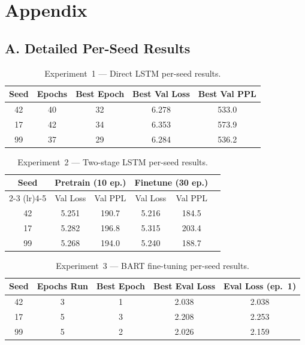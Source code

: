 \documentclass{article}
\begin{document}
\section*{Appendix}

\subsection*{A. Detailed Per-Seed Results}

\begin{table}[ht]
  \caption{Experiment~1 --- Direct LSTM per-seed results.}
  \centering
  \small
  \begin{tabular}{ccccc}
    \toprule
    Seed & Epochs & Best Epoch & Best Val Loss & Best Val PPL \\
    \midrule
    42 & 40 & 32 & 6.278 & 533.0 \\
    17 & 42 & 34 & 6.353 & 573.9 \\
    99 & 37 & 29 & 6.284 & 536.2 \\
    \bottomrule
  \end{tabular}
\end{table}

\begin{table}[ht]
  \caption{Experiment~2 --- Two-stage LSTM per-seed results.}
  \centering
  \small
  \begin{tabular}{cccccc}
    \toprule
    Seed & \multicolumn{2}{c}{Pretrain (10 ep.)} & \multicolumn{2}{c}{Finetune (30 ep.)} \\
    \cmidrule(lr){2-3} \cmidrule(lr){4-5}
     & Val Loss & Val PPL & Val Loss & Val PPL \\
    \midrule
    42 & 5.251 & 190.7 & 5.216 & 184.5 \\
    17 & 5.282 & 196.8 & 5.315 & 203.4 \\
    99 & 5.268 & 194.0 & 5.240 & 188.7 \\
    \bottomrule
  \end{tabular}
\end{table}

\begin{table}[ht]
  \caption{Experiment~3 --- BART fine-tuning per-seed results.}
  \centering
  \small
  \begin{tabular}{ccccc}
    \toprule
    Seed & Epochs Run & Best Epoch & Best Eval Loss & Eval Loss (ep.\ 1) \\
    \midrule
    42 & 3 & 1 & 2.038 & 2.038 \\
    17 & 5 & 3 & 2.208 & 2.253 \\
    99 & 5 & 2 & 2.026 & 2.159 \\
    \bottomrule
  \end{tabular}
\end{table}
\end{document}
